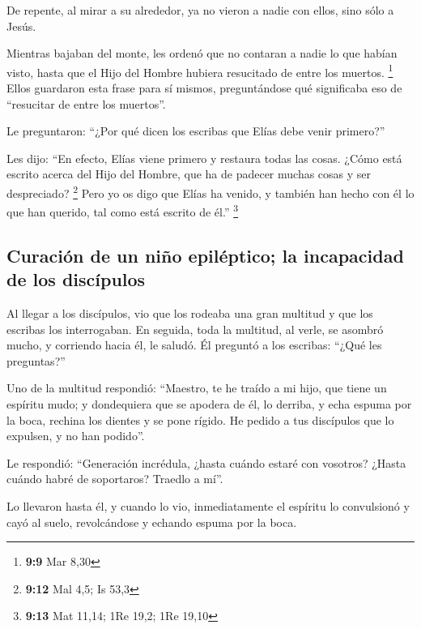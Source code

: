 De repente, al mirar a su alrededor, ya no vieron a nadie
con ellos, sino sólo a Jesús.

 Mientras bajaban del monte, les ordenó que no contaran a
nadie lo que habían visto, hasta que el Hijo del Hombre hubiera
resucitado de entre los muertos. \footnote{\textbf{9:9} Mar 8,30}
 Ellos guardaron esta frase para sí mismos, preguntándose
qué significaba eso de ``resucitar de entre los muertos''.

 Le preguntaron: ``¿Por qué dicen los escribas que Elías
debe venir primero?''

 Les dijo: ``En efecto, Elías viene primero y restaura
todas las cosas. ¿Cómo está escrito acerca del Hijo del Hombre, que ha
de padecer muchas cosas y ser despreciado? \footnote{\textbf{9:12} Mal
  4,5; Is 53,3}  Pero yo os digo que Elías ha venido, y
también han hecho con él lo que han querido, tal como está escrito de
él.'' \footnote{\textbf{9:13} Mat 11,14; 1Re 19,2; 1Re 19,10}

\hypertarget{curaciuxf3n-de-un-niuxf1o-epiluxe9ptico-la-incapacidad-de-los-discuxedpulos}{%
\subsection{Curación de un niño epiléptico; la incapacidad de los
discípulos}\label{curaciuxf3n-de-un-niuxf1o-epiluxe9ptico-la-incapacidad-de-los-discuxedpulos}}

 Al llegar a los discípulos, vio que los rodeaba una gran
multitud y que los escribas los interrogaban.  En
seguida, toda la multitud, al verle, se asombró mucho, y corriendo hacia
él, le saludó.  Él preguntó a los escribas: ``¿Qué les
preguntas?''

 Uno de la multitud respondió: ``Maestro, te he traído a
mi hijo, que tiene un espíritu mudo;  y dondequiera que
se apodera de él, lo derriba, y echa espuma por la boca, rechina los
dientes y se pone rígido. He pedido a tus discípulos que lo expulsen, y
no han podido''.

 Le respondió: ``Generación incrédula, ¿hasta cuándo
estaré con vosotros? ¿Hasta cuándo habré de soportaros? Traedlo a mí''.

 Lo llevaron hasta él, y cuando lo vio, inmediatamente el
espíritu lo convulsionó y cayó al suelo, revolcándose y echando espuma
por la boca.

